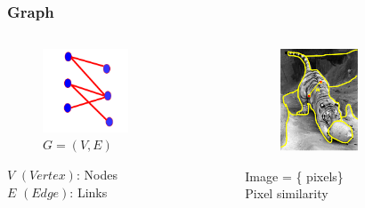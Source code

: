 \documentclass[notheorems,mathserif,table,compress]{beamer}  %
\begin{document}
\begin{frame}
   \frametitle{Graph}
    \begin{columns}
       \begin{column}[c]{0.45\textwidth}
          \begin{figure}[!ht]
          \centering
          \includegraphics[width=1.0in]{g_ve.png}\\
	  {\textbf{\huge $G=(V,E)$}}
          \end{figure}
         \hspace{0.3in} $V$ $(Vertex)$: Nodes \\
	  \hspace{0.3in} $E$ $(Edge)$: Links
       \end{column}

       \begin{column}[c]{0.55\textwidth}
          \begin{figure}[l]
          \centering
          \includegraphics[width=0.9in]{g_ve1.png}
          \end{figure}
      \hspace{0.4in} Image = \{ pixels\} \\
     \hspace{0.4in}  Pixel similarity
      \end{column}
    \end{columns}
\end{frame}
\end{document}
